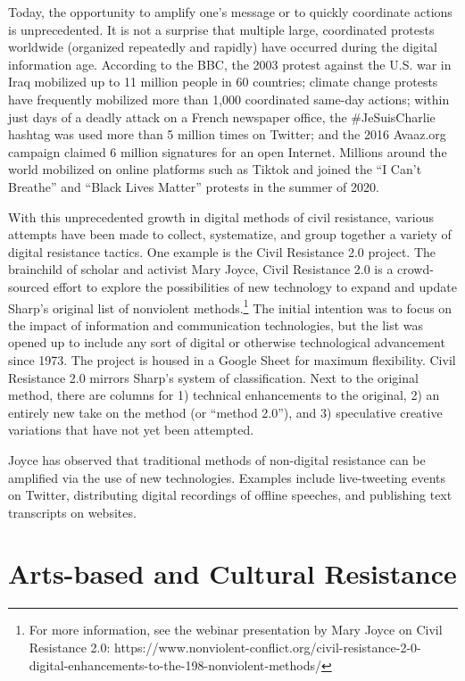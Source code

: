 \documentclass[twoside,a4paper,12pt,fleqn,openany]{extbook}
\begin{document}
Today, the opportunity to amplify one’s message or to quickly coordinate actions is unprecedented. It is not a surprise that multiple large, coordinated protests worldwide (organized repeatedly and rapidly) have occurred during the digital information age. According to the BBC, the 2003 protest against the U.S. war in Iraq mobilized up to 11 million people in 60 countries; climate change protests have frequently mobilized more than 1,000 coordinated same-day actions; within just days of a deadly attack on a French newspaper office, the #JeSuisCharlie hashtag was used more than 5 million times on Twitter; and the 2016 Avaaz.org campaign claimed 6 million signatures for an open Internet. Millions around the world mobilized on online platforms such as Tiktok and joined the “I Can’t Breathe” and “Black Lives Matter” protests in the summer of 2020.

With this unprecedented growth in digital methods of civil resistance, various attempts have been made to collect, systematize, and group together a variety of digital resistance tactics. One example is the Civil Resistance 2.0 project. The brainchild of scholar and activist Mary Joyce, Civil Resistance 2.0 is a crowd-sourced effort to explore the possibilities of new technology to expand and update Sharp’s original list of nonviolent methods.\footnote{For more information, see the webinar presentation by Mary Joyce on Civil Resistance 2.0: https://www.nonviolent-conflict.org/civil-resistance-2-0-digital-enhancements-to-the-198-nonviolent-methods/} The initial intention was to focus on the impact of information and communication technologies, but the list was opened up to include any sort of digital or otherwise technological advancement since 1973. The project is housed in a Google Sheet for maximum flexibility. Civil Resistance
2.0 mirrors Sharp’s system of classification. Next to the original method, there are columns for 1) technical enhancements to the original, 2) an entirely new take on the method (or “method 2.0”), and 3) speculative creative variations that have not yet been attempted.

Joyce has observed that traditional methods of non-digital resistance can be amplified via the use of new technologies. Examples include live-tweeting events on Twitter, distributing digital recordings of offline speeches, and publishing text transcripts on websites.

\section*{Arts-based and Cultural Resistance}
\end{document}
